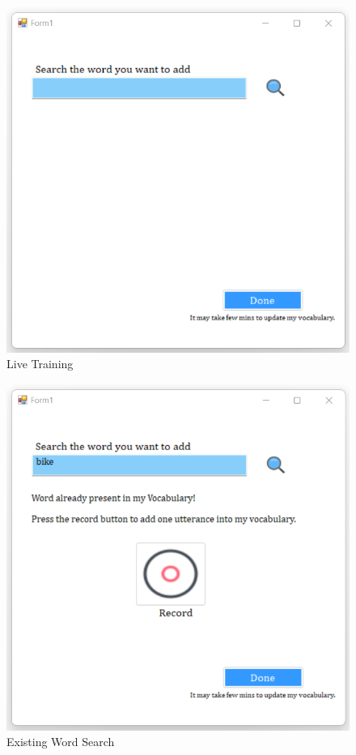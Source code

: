 \documentclass{article}
\begin{document}
\begin{figure}
\includegraphics[scale=1.0]{searchPage.png}
\caption{Live Training}
\label{fig:train}
\end{figure}
\begin{figure}
\includegraphics[scale=1.0]{existingWord.png}
\caption{Existing Word Search}
\label{fig:searchOld}
\end{figure}
\end{document}
